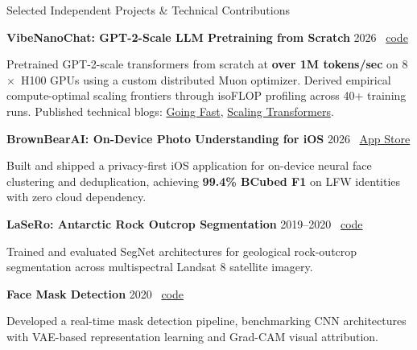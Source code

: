 \documentclass{resume}
\begin{document}
\begin{rSection}{Selected Independent Projects \& Technical Contributions}

\textbf{VibeNanoChat: GPT-2-Scale LLM Pretraining from Scratch} \hfill 2026 \textbar\ \href{https://github.com/divyanshu25/VibeNanoChat}{code} \\
{\raggedright Pretrained \mbox{GPT-2-scale} transformers from scratch at {\bf over 1M tokens/sec} on 8$\times$~H100 GPUs using a custom distributed Muon optimizer. Derived empirical \mbox{compute-optimal} scaling frontiers through isoFLOP profiling across 40+ training runs. Published technical blogs: \href{https://divyanshu25.github.io/blog/llm-training-optimizations/}{Going Fast}, \href{https://divyanshu25.github.io/blog/scaling-transformers/}{Scaling Transformers}.\par}

\vspace{0.45em}
\textbf{BrownBearAI: On-Device Photo Understanding for iOS} \hfill 2026 \textbar\ \href{https://apps.apple.com/app/id6796580170}{App Store} \\
{\raggedright Built and shipped a \mbox{privacy-first} iOS application for \mbox{on-device} neural face clustering and deduplication, achieving {\bf 99.4\% BCubed F1} on LFW identities with zero cloud dependency.\par}

\vspace{0.45em}
\textbf{LaSeRo: Antarctic Rock Outcrop Segmentation} \hfill 2019--2020 \textbar\ \href{https://github.com/selkind/LaSeRo}{code} \\
{\raggedright Trained and evaluated SegNet architectures for geological \mbox{rock-outcrop} segmentation across multispectral Landsat 8 satellite imagery.\par}

\vspace{0.45em}
\textbf{Face Mask Detection} \hfill 2020 \textbar\ \href{https://github.com/divyanshu25/FaceMaskDetection}{code} \\
{\raggedright Developed a \mbox{real-time} mask detection pipeline, benchmarking CNN architectures with \mbox{VAE-based} representation learning and \mbox{Grad-CAM} visual attribution.\par}

\end{rSection}

\end{document}

